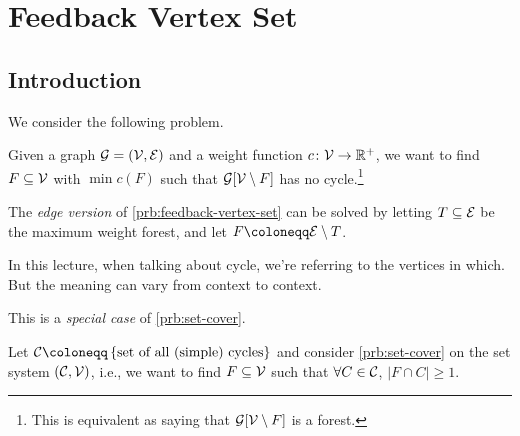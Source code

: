 \section{Feedback Vertex Set}

\subsection{Introduction}
We consider the following problem.

\begin{problem}\label{prb:feedback-vertex-set}
Given a graph \(\mathcal{\MakeUppercase{g}} = (\mathcal{\MakeUppercase{v}} , \mathcal{\MakeUppercase{e}} )\) and a weight function \(c\colon \mathcal{\MakeUppercase{v}} \to \mathbb{\MakeUppercase{r}} ^+\), we want to find \(F\subseteq \mathcal{\MakeUppercase{v}} \) with \(\min c(F)\) such that \(\mathcal{\MakeUppercase{g}} [\mathcal{\MakeUppercase{v}} \setminus F]\) has no cycle.\footnote{This is equivalent as saying that \(\mathcal{\MakeUppercase{g}} [\mathcal{\MakeUppercase{v}} \setminus F]\) is a forest.}
\end{problem}

\begin{note}
	The \emph{edge version} of \autoref{prb:feedback-vertex-set} can be solved by letting \(T\subseteq \mathcal{\MakeUppercase{e}} \) be the maximum weight forest, and let \(F \coloneqq \mathcal{\MakeUppercase{e}} \setminus T\).
\end{note}

\begin{notation}
	In this lecture, when talking about cycle, we're referring to the vertices in which. But the meaning can vary from context to context.
\end{notation}

\begin{remark}
	This is a \emph{special case} of \autoref{prb:set-cover}.
\end{remark}
\begin{explanation}
	Let \(\mathcal{\MakeUppercase{C}} \coloneqq \left\{ \text{set of all (simple) cycles}  \right\}\) and consider \autoref{prb:set-cover} on the set system \((\mathcal{\MakeUppercase{C}} , \mathcal{\MakeUppercase{v}} )\), i.e., we want to find \(F\subseteq \mathcal{\MakeUppercase{v}} \) such that \(\forall C\in \mathcal{\MakeUppercase{C}} \), \(\left\vert F \cap C \right\vert \geq 1\).
\end{explanation}

